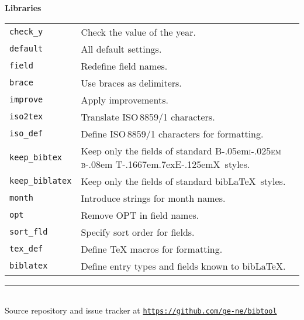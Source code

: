 \documentclass[a4paper]{article}
\newcommand\BibTeX{\textrm{B\kern-.05em\textsc{i\kern-.025em b}\kern-.08em
        T\kern-.1667em\lower.7ex\hbox{E}\kern-.125emX}}
\newcommand\Section[1]{\begin{center}\normalsize\bfseries
    #1\end{center}\nobreak }
\newcommand\Lib[1]{\texttt{#1}}
\newcommand\link[1]{\href{#1}{\texttt{#1}}}
\begin{document}
\begin{multicols}{4}
  \columnbreak
  \Section{Libraries}
  \begin{tabular}{lp{}}
  \Lib{check\_y}	& Check the value of the year.\\
  \Lib{default}		& All default settings.\\
  \Lib{field}		& Redefine field names.\\
  \Lib{brace}		& Use braces as delimiters.\\
  \Lib{improve}		& Apply improvements.\\
  \Lib{iso2tex}		& Translate ISO\,8859/1 characters.\\
  \Lib{iso\_def}	& Define ISO\,8859/1 characters for formatting.\\
  \Lib{keep\_bibtex}	& Keep only the fields of standard \BibTeX\ styles.\\
  \Lib{keep\_biblatex}	& Keep only the fields of standard bib\LaTeX\ styles.\\
  \Lib{month}		& Introduce strings for month names.\\
  \Lib{opt}		& Remove OPT in field names.\\
  \Lib{sort\_fld}	& Specify sort order for fields.\\
  \Lib{tex\_def}	& Define \TeX{} macros for formatting.\\
  \Lib{biblatex}	& Define entry types and fields known to bib\-\LaTeX.\\
  \end{tabular}
\end{multicols}
\vfill\vfill\vfill
\begin{center}\rule{.8\textwidth}{.1pt}\\
Source repository and issue tracker at \link{https://github.com/ge-ne/bibtool}
\end{center}
\end{document}
